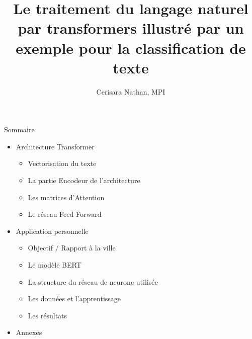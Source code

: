 \documentclass[12pt]{beamer}
\title{Le traitement du langage naturel par transformers illustré par un exemple pour la classification de texte}
\author{Cerisara Nathan, MPI}
\begin{document}
\maketitle


\begin{frame}{Sommaire}

\begin{itemize}
  \item Architecture Transformer
  	\begin{itemize}
  		\item Vectorisation du texte
  		\item La partie Encodeur de l'architecture
  		\item Les matrices d'Attention
  		\item Le réseau Feed Forward
  	\end{itemize}
  \vspace{7px}
  \item Application personnelle
     \begin{itemize}
      		\item Objectif / Rapport à la ville
      		\item Le modèle BERT
      		\item La structure du réseau de neurone utilisée
      		\item Les données et l'apprentissage
      		\item Les résultats
     \end{itemize}
     \vspace{7px}
     \item Annexes
\end{itemize}

\end{frame}

\end{document}
